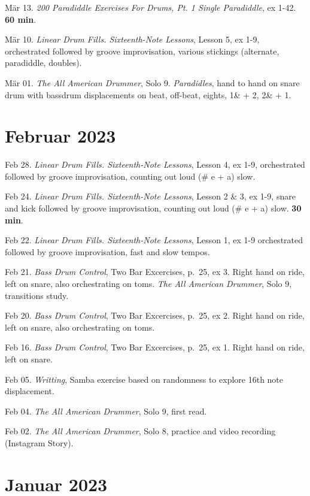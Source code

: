 \documentclass[
]{book}
\begin{document}
Mär 13. \emph{200 Paradiddle Exercises For Drums, Pt. 1 Single Paradiddle}, ex 1-42. \textbf{60 min}.

Mär 10. \emph{Linear Drum Fills. Sixteenth-Note Lessons}, Lesson 5, ex 1-9, orchestrated followed by groove improvisation, various stickings (alternate, paradiddle, doubles).

Mär 01. \emph{The All American Drummer}, Solo 9. \emph{Paradidles}, hand to hand on snare drum with bassdrum displacements on beat, off-beat, eights, 1\& + 2, 2\& + 1.

\hypertarget{februar-2023}{%
\section*{Februar 2023}\label{februar-2023}}

Feb 28. \emph{Linear Drum Fills. Sixteenth-Note Lessons}, Lesson 4, ex 1-9, orchestrated followed by groove improvisation, counting out loud (\# e + a) slow.

Feb 24. \emph{Linear Drum Fills. Sixteenth-Note Lessons}, Lesson 2 \& 3, ex 1-9, snare and kick followed by groove improvisation, counting out loud (\# e + a) slow. \textbf{30 min}.

Feb 22. \emph{Linear Drum Fills. Sixteenth-Note Lessons}, Lesson 1, ex 1-9 orchestrated followed by groove improvisation, fast and slow tempos.

Feb 21. \emph{Bass Drum Control}, Two Bar Excercises, p.~25, ex 3. Right hand on ride, left on snare, also orchestrating on toms. \emph{The All American Drummer}, Solo 9, transitions study.

Feb 20. \emph{Bass Drum Control}, Two Bar Excercises, p.~25, ex 2. Right hand on ride, left on snare, also orchestrating on toms.

Feb 16. \emph{Bass Drum Control}, Two Bar Excercises, p.~25, ex 1. Right hand on ride, left on snare.

Feb 05. \emph{Writting}, Samba exercise based on randomness to explore 16th note displacement.

Feb 04. \emph{The All American Drummer}, Solo 9, first read.

Feb 02. \emph{The All American Drummer}, Solo 8, practice and video recording (Instagram Story).

\hypertarget{januar-2023}{%
\section*{Januar 2023}\label{januar-2023}}
\end{document}
